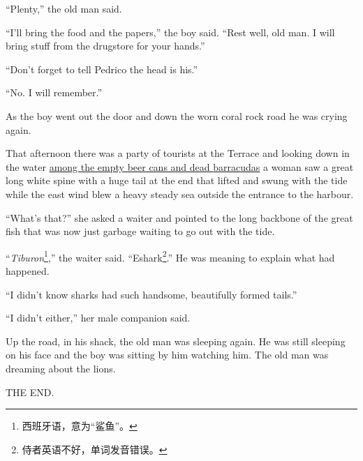 \documentclass[fontset=ubuntu]{ctexrep}
\begin{document}
``Plenty,'' the old man said.

``I'll bring the food and the papers,'' the boy said. ``Rest well, old man.
I will bring stuff from the \gls{drugstore} for your hands.''

``Don't forget to tell Pedrico the head is his.''

``No. I will remember.''

As the boy went out the door and down the worn coral rock road he was
crying again.

That afternoon there was a party of tourists at the Terrace and looking down
in the water \uline{among the empty beer cans and dead \glspl{barracuda}} a
woman saw a great long white \gls{spine} with a huge tail at the end that
lifted and swung with the \gls{tide} while the east wind blew a heavy steady
sea outside the \gls{entrance} to the harbour.

``What's that?'' she asked a waiter and pointed to the long backbone of the
great fish that was now just \gls{garbage} waiting to go out with the tide.

``\emph{Tiburon}\footnote{西班牙语，意为“鲨鱼”。},'' the waiter said.
``Eshark\footnote{侍者英语不好，单词发音错误。}.'' He was meaning to explain
what had happened.

``I didn't know sharks had such handsome, \gls{beautifully} formed tails.''

``I didn't either,'' her male \gls{companion} said.

Up the road, in his shack, the old man was sleeping again. He was still
sleeping on his face and the boy was sitting by him watching him. The old
man was dreaming about the lions.

\begin{center}
THE END.
\end{center}



\printunsrtglossary[style={mcolindexgroup },title={Glossary 词汇表}]
\end{document}
